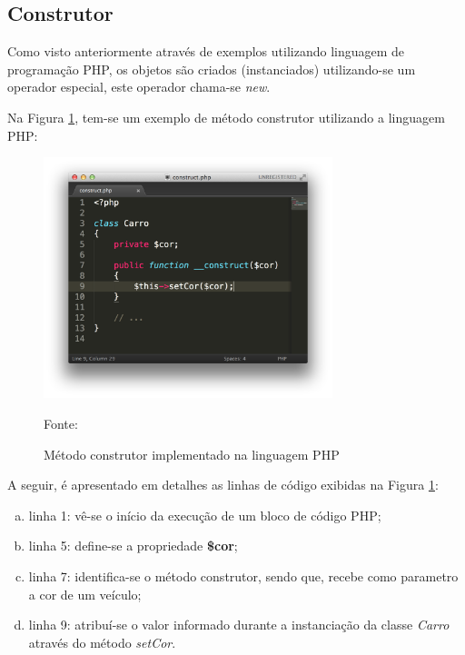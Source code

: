 \subsection{Construtor}

Como visto anteriormente através de exemplos utilizando linguagem de
programação \acs{PHP}, os objetos são criados (instanciados) utilizando-se um
operador especial, este operador chama-se \textit{new}.


Na Figura \ref{fig:metodoConstrutor}, tem-se um exemplo de método construtor
utilizando a linguagem \acs{PHP}:

\begin{figure}[h!tb]
	\caption{Método construtor implementado na linguagem PHP}
	\label{fig:metodoConstrutor}

	\centering
	\includegraphics[width=0.75\textwidth]{images/construct.png}

	\centering
	\footnotesize Fonte: \fonteOAutor
\end{figure}

\FloatBarrier 	%

A seguir, é apresentado em detalhes as linhas de código exibidas na Figura 
\ref{fig:metodoConstrutor}:

\begin{enumerate}[a)]
    \item linha 1: vê-se o início da execução de um bloco de código PHP;
    \item linha 5: define-se a propriedade \textbf{\$cor};
    \item linha 7: identifica-se o método construtor, sendo que, recebe como
    parametro a cor de um veículo;
    \item linha 9: atribuí-se o valor informado durante a instanciação da classe
    \textit{Carro} através do método \textit{setCor}.
\end{enumerate}

